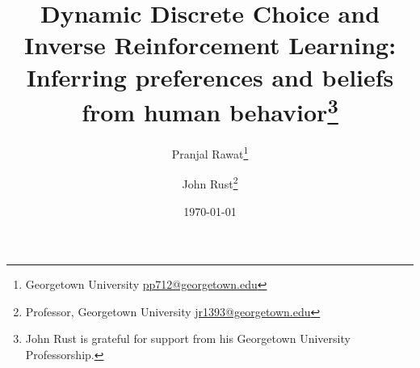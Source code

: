 \documentclass[11pt]{article}
\title{ \vspace*{1cm} \hspace*{-0.5cm}Dynamic Discrete Choice and Inverse Reinforcement Learning:\\
Inferring preferences and beliefs from human behavior\footnote{John Rust is grateful for support
from his Georgetown University Professorship.
}}
\author{
Pranjal Rawat\thanks{Georgetown University  \href{mailto:pp712@georgetown.edu}{pp712@georgetown.edu}}
\and
John Rust\thanks{Professor, Georgetown University
\href{mailto:jr1393@georgetown.edu}{jr1393@georgetown.edu}}}
\date{\today }
\begin{document}
\bgroup
\let\footnoterule\relax

\begin{singlespace}
\maketitle


\begin{abstract}
%

\end{abstract}
\end{singlespace}
\end{document}
